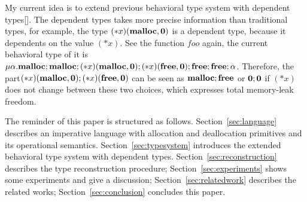 My current idea is to extend previous behavioral type system with
dependent types[]. The dependent types takes more precise information
than traditional types, for example, the type
\((*x)(\mathbf{malloc}, \mathbf{0})\) is a dependent type, because it dependents
on the value \((*x)\). See the function \(foo\) again, the current
behavioral type of it is \(
\mu\alpha.\mathbf{malloc};\mathbf{malloc};(*x)(\mathbf{malloc}, \mathbf{0});(*x)(\mathbf{free}, \mathbf{0});\mathbf{free};\mathbf{free};\alpha
\). Therefore, the part\((*x)(\mathbf{malloc}, \mathbf{0});(*x)(\mathbf{free}, \mathbf{0})\)
can be seen as \(\mathbf{malloc};\mathbf{free}\) or \(\mathbf{0};\mathbf{0}\) if \((*x)\) does
not change between these two choices, which expresses total
memory-leak freedom.

The reminder of this paper is structured as
follows. Section~\ref{sec:language} describes an imperative language
with allocation and deallocation primitives and its operational
semantics. Section~\ref{sec:typesystem} introduces the extended
behavioral type system with dependent
types. Section~\ref{sec:reconstruction} describes the type
reconstruction procedure; Section~\ref{sec:experiments} shows some
experiments and give a discussion; Section~\ref{sec:relatedwork}
describes the related works; Section~\ref{sec:conclusion} concludes
this paper.
